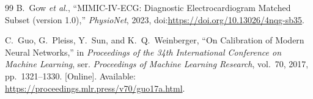 \begin{thebibliography}{99}
B.~Gow \textit{et al.}, ``MIMIC-IV-ECG: Diagnostic Electrocardiogram Matched Subset (version 1.0),'' \textit{PhysioNet}, 2023, doi:\url{https://doi.org/10.13026/4nqg-sb35}.

C.~Guo, G.~Pleiss, Y.~Sun, and K.~Q.~Weinberger, ``On Calibration of Modern Neural Networks,'' in \textit{Proceedings of the 34th International Conference on Machine Learning}, ser. \textit{Proceedings of Machine Learning Research}, vol.~70, 2017, pp.~1321--1330. [Online]. Available: \url{https://proceedings.mlr.press/v70/guo17a.html}.

\end{thebibliography}
